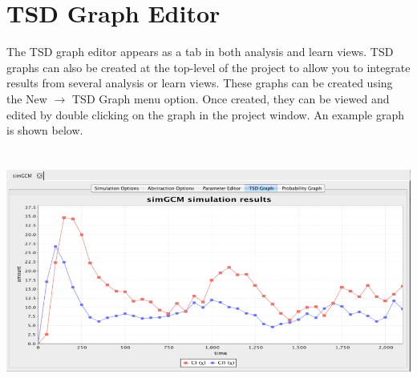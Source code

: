\documentclass[titlepage,11pt]{article}
\begin{document}
\clearpage

\section{\label{TSDEdit}TSD Graph Editor}

\noindent
The TSD graph editor appears as a tab in both analysis and learn
views.  TSD graphs can also be created at the top-level of the project
to allow you to integrate results from several analysis or learn
views. These graphs can be created using the New $\rightarrow$ TSD Graph
menu option. Once created, they can be viewed and edited by double
clicking on the graph in the project window.  An example graph is
shown below.
\begin{center}
\includegraphics[height=80mm]{screenshots/TSDgraph}
\end{center}
\end{document}
